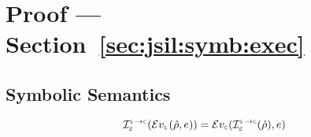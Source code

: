 \newpage


\newpage 



\section{Proof --- Section~\ref{sec:jsil:symb:exec}}

\subsection{Symbolic Semantics}

\begin{lemma}\label{symb:eval:expr}
$$
\interpret{\symbconc}{\senv}(\evalexpr{\symbolic}(\sstore, \jsilexpr)) = \evalexpr{\concrete}(\interpret{\symbconc}{\senv}(\sstore), \jsilexpr)
$$
\end{lemma}
